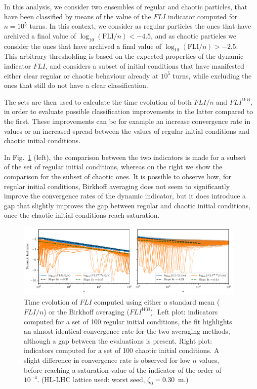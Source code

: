 In this analysis, we consider two ensembles of regular and chaotic particles, that have been classified by means of the value of the $FLI$ indicator computed for $n=10^5$ turns. In this context, we consider as regular particles the ones that have archived a final value of $\log_{10}(\mathrm{FLI}/n) < -4.5$, and as chaotic particles we consider the ones that have archived a final value of $\log_{10}(\mathrm{FLI}/n) > -2.5$. This arbitrary thresholding is based on the expected properties of the dynamic indicator $FLI$, and considers a subset of initial conditions that have manifested either clear regular or chaotic behaviour already at $10^5$ turns, while excluding the ones that still do not have a clear classification.

The sets are then used to calculate the time evolution of both $FLI/n$ and $FLI^{WB}$, in order to evaluate possible classification improvements in the latter compared to the first. These improvements can be for example an increase convergence rate in values or an increased spread between the values of regular initial conditions and chaotic initial conditions.

In Fig.~\ref{fig:fli_compare_mean_birk} (left), the comparison between the two indicators is made for a subset of the set of regular initial conditions, whereas on the right we show the comparison for the subset of chaotic ones. It is possible to observe how, for regular initial conditions, Birkhoff averaging does not seem to significantly improve the convergence rates of the dynamic indicator, but it does introduce a gap that slightly improves the gap between regular and chaotic initial conditions, once the chaotic initial conditions reach saturation.

\begin{figure}[htp]
    \centering
    \includegraphics[width=1.0\textwidth]{6_lhc_dynamic_indicators/figs/fli_vs_flibk_idx_2.pdf}
    \caption{Time evolution of $FLI$ computed using either a standard mean ($FLI/n$) or the Birkhoff averaging ($FLI^{WB}$). Left plot: indicators computed for a set of 100 regular initial conditions, the fit highlights an almost identical convergence rate for the two averaging methods, although a gap between the evaluations is present. Right plot: indicators computed for a set of 100 chaotic initial conditions. A slight difference in convergence rate is observed for low $n$ values, before reaching a saturation value of the indicator of the order of $10^{-4}$. (HL-LHC lattice used: worst seed, $\zeta_0=$\SI{0.30}{\meter}.)}
    \label{fig:fli_compare_mean_birk}
\end{figure}

